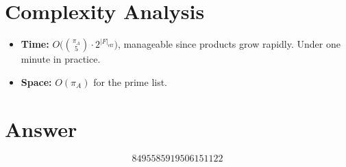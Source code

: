 \documentclass[12pt]{article}
\begin{document}
\section{Complexity Analysis}
\begin{itemize}
    \item \textbf{Time:} $O\!\bigl(\binom{\pi_A}{5} \cdot 2^{|F|_{\mathrm{eff}}}\bigr)$, manageable since products grow rapidly. Under one minute in practice.
    \item \textbf{Space:} $O(\pi_A)$ for the prime list.
\end{itemize}

\section{Answer}

\[
\boxed{8495585919506151122}
\]
\end{document}
